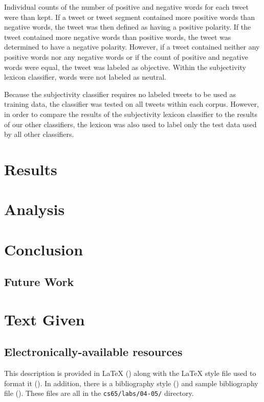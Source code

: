 \documentclass[11pt]{article}
\begin{document}
\indent Individual counts of the number of positive and negative words for each tweet were than kept. If a tweet or tweet segment contained more positive words than negative words, the tweet was then defined as having a positive polarity. If the tweet contained more negative words than positive words, the tweet was determined to have a negative polarity. However, if a tweet contained neither any positive words nor any negative words or if the count of positive and negative words were equal, the tweet was labeled as objective. Within the subjectivity lexicon classifier, words were not labeled as neutral.

\indent Because the subjectivity classifier requires no labeled tweets to be used as training data, the classifier was tested on all tweets within each corpus. However, in order to compare the results of the subjectivity lexicon classifier to the results of our other classifiers, the lexicon was also used to label only the test data used by all other classifiers.

\section{Results}

\section{Analysis}

\section{Conclusion}
\subsection{Future Work}

\section{Text Given}
\subsection{Electronically-available resources}

This description is provided in \LaTeX{} () along
with the \LaTeX{} style file used to format it
().  In addition, there is a bibliography style
() and sample bibliography file
().  These files are all in the {\tt cs65/labs/04-05/}
directory.
\end{document}
